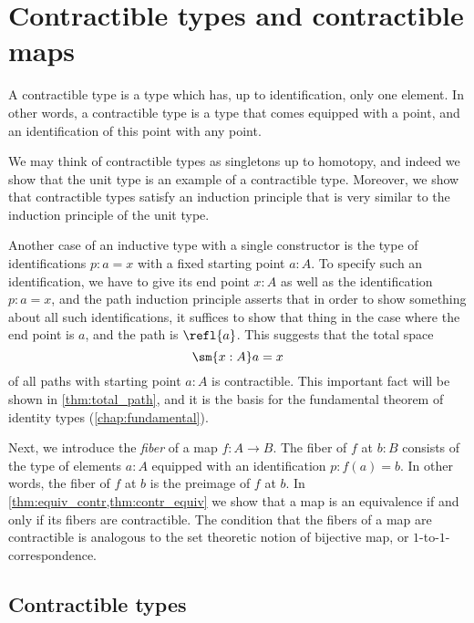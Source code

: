 
\section{Contractible types and contractible maps}
\label{sec:contractible}

A contractible type is a type which has, up to identification, only one element. In other words, a contractible type is a type that comes equipped with a point, and an identification of this point with any point.

We may think of contractible types as singletons up to homotopy, and indeed we show that the unit type is an example of a contractible type. Moreover, we show that contractible types satisfy an induction principle that is very similar to the induction principle of the unit type.

Another case of an inductive type with a single constructor is the type of identifications $p:a=x$ with a fixed starting point $a:A$. To specify such an identification, we have to give its end point $x:A$ as well as the identification $p:a=x$, and the path induction principle asserts that in order to show something about all such identifications, it suffices to show that thing in the case where the end point is $a$, and the path is $\refl{a}$. This suggests that the total space
\begin{equation*}
  \sm{x:A}a=x
\end{equation*}
of all paths with starting point $a:A$ is contractible. This important fact will be shown in \cref{thm:total_path}, and it is the basis for the fundamental theorem of identity types (\cref{chap:fundamental}).

Next, we introduce the \emph{fiber} of a map $f:A\to B$. The fiber of $f$ at $b:B$ consists of the type of elements $a:A$ equipped with an identification $p:f(a)=b$. In other words, the fiber of $f$ at $b$ is the preimage of $f$ at $b$. In \cref{thm:equiv_contr,thm:contr_equiv} we show that a map is an equivalence if and only if its fibers are contractible. The condition that the fibers of a map are contractible is analogous to the set theoretic notion of bijective map, or $1$-to-$1$-correspondence.

\subsection{Contractible types}

